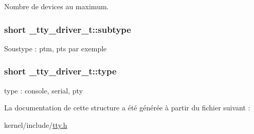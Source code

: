 \-Nombre de devices au maximum. \hypertarget{struct__tty__driver__t_a291fe7f9436ef9cbe34b490d516f46bd}{
\subsubsection[{subtype}]{\setlength{\rightskip}{0pt plus 5cm}short {\bf \-\_\-tty\-\_\-driver\-\_\-t\-::subtype}}}\label{struct__tty__driver__t_a291fe7f9436ef9cbe34b490d516f46bd}
\-Soustype \-: ptm, pts par exemple \hypertarget{struct__tty__driver__t_a0c9f7f164f7454cf2bea36de5e23a5d1}{
\subsubsection[{type}]{\setlength{\rightskip}{0pt plus 5cm}short {\bf \-\_\-tty\-\_\-driver\-\_\-t\-::type}}}\label{struct__tty__driver__t_a0c9f7f164f7454cf2bea36de5e23a5d1}
type \-: console, serial, pty 

\-La documentation de cette structure a été générée à partir du fichier suivant \-:\begin{DoxyCompactItemize}
\item 
kernel/include/\hyperlink{tty_8h}{tty.\-h}\end{DoxyCompactItemize}
